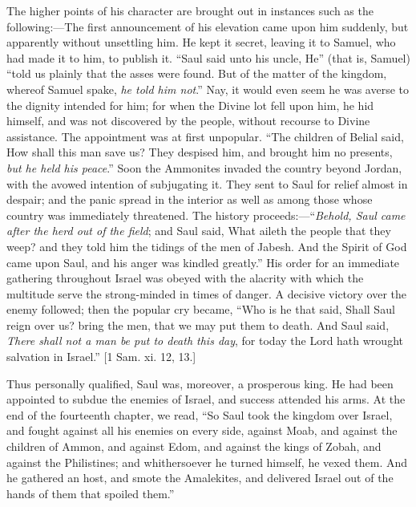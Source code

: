 The higher points of his character are brought out in
instances such as the following:—The first announcement of his
elevation came upon him suddenly, but apparently without unsettling
him. He kept it secret, leaving it to Samuel, who had made it to him,
to publish it. ``Saul said unto his uncle, He'' (that is,
Samuel) ``told us plainly that the asses were found. But of the
matter of the kingdom, whereof Samuel spake, \emph{he told him not}.''
Nay, it would even seem he was averse to the dignity intended for him;
for when the Divine lot fell upon him, he hid himself, and was not
discovered by the people, without recourse to Divine assistance. The
appointment was at first unpopular. ``The children of Belial said,
How shall this man save us? They despised him, and brought him no
presents, \emph{but he held his peace}.'' Soon the Ammonites
invaded the country beyond Jordan, with the avowed intention of
subjugating it. They sent to Saul for relief almost in despair; and
the panic spread in the interior as well as among those whose country
was immediately threatened. The history proceeds:—``\emph{Behold,
Saul came after the herd out of the field}; and Saul said, What
aileth the people that they weep? and they told him the tidings of the
men of Jabesh. And the Spirit of God came upon Saul, and his anger was
kindled greatly.'' His order for an immediate gathering throughout
Israel was obeyed with the alacrity with which the multitude serve the
strong-minded in times of danger. A decisive victory over the enemy
followed; then the popular cry became, ``Who is he that said,
Shall Saul reign over us? bring the men, that we may put them to
death. And Saul said, \emph{There shall not a man be put to death this
day}, for today the Lord hath wrought salvation in Israel.'' [1
Sam. xi. 12, 13.]

Thus personally qualified, Saul was, moreover, a prosperous king.
He had been appointed to subdue the enemies of Israel, and success
attended his arms. At the end of the fourteenth chapter, we read,
``So Saul took the kingdom over Israel, and fought against all his
enemies on every side, against Moab, and against the children of Ammon,
and against Edom, and against the kings of Zobah, and against the
Philistines; and whithersoever he turned himself, he vexed them. And
he gathered an host, and smote the Amalekites, and delivered Israel
out of the hands of them that spoiled them.''

